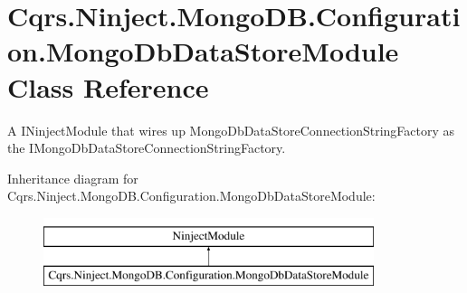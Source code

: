 \hypertarget{classCqrs_1_1Ninject_1_1MongoDB_1_1Configuration_1_1MongoDbDataStoreModule}{}\section{Cqrs.\+Ninject.\+Mongo\+D\+B.\+Configuration.\+Mongo\+Db\+Data\+Store\+Module Class Reference}
\label{classCqrs_1_1Ninject_1_1MongoDB_1_1Configuration_1_1MongoDbDataStoreModule}


A I\+Ninject\+Module that wires up Mongo\+Db\+Data\+Store\+Connection\+String\+Factory as the I\+Mongo\+Db\+Data\+Store\+Connection\+String\+Factory.  


Inheritance diagram for Cqrs.\+Ninject.\+Mongo\+D\+B.\+Configuration.\+Mongo\+Db\+Data\+Store\+Module\+:\begin{figure}[H]
\begin{center}
\leavevmode
\includegraphics[height=2.000000cm]{classCqrs_1_1Ninject_1_1MongoDB_1_1Configuration_1_1MongoDbDataStoreModule}
\end{center}
\end{figure}
